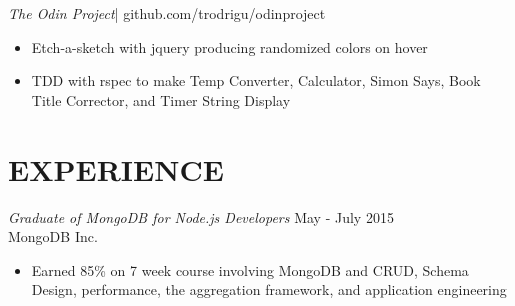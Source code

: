\documentclass[margin]{res}
\begin{document}
\begin{resume}
  {\sl The Odin Project}|
  github.com/trodrigu/odinproject 
  \begin{itemize}
       \item Etch-a-sketch with jquery producing randomized colors on hover
       \item TDD with rspec to make Temp Converter, Calculator, Simon Says, Book Title Corrector, and Timer String Display
  \end{itemize} 

\section{EXPERIENCE} 

  {\sl Graduate of MongoDB for Node.js Developers} \hfill May - July 2015 \\
  MongoDB Inc.
  \begin{itemize}
      \item Earned 85\% on 7 week course involving MongoDB and CRUD, Schema Design, performance, the aggregation framework, and application engineering
  \end{itemize}


\end{resume}
\end{document}

